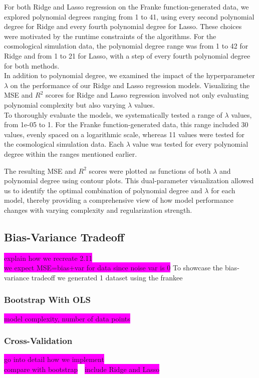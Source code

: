 \documentclass[aps,pra,english,notitlepage,reprint,nofootinbib]{revtex4-1}  %
\begin{document}
For both Ridge and Lasso regression on the Franke function-generated data, we explored polynomial degrees ranging from 1 to 41, using every second polynomial degree for Ridge and every fourth polynomial degree for Lasso. These choices were motivated by the runtime constraints of the algorithms. For the cosmological simulation data, the polynomial degree range was from 1 to 42 for Ridge and from 1 to 21 for Lasso, with a step of every fourth polynomial degree for both methods.\\

In addition to polynomial degree, we examined the impact of the hyperparameter $\lambda$ on the performance of our Ridge and Lasso regression models. Visualizing the MSE and $R^2$ scores for Ridge and Lasso regression involved not only evaluating polynomial complexity but also varying $\lambda$ values.\\

To thoroughly evaluate the models, we systematically tested a range of $\lambda$ values, from 1e-05 to 1. For the Franke function-generated data, this range included 30 values, evenly spaced on a logarithmic scale, whereas 11 values were tested for the cosmological simulation data. Each $\lambda$ value was tested for every polynomial degree within the ranges mentioned earlier.

The resulting MSE and $R^2$ scores were plotted as functions of both $\lambda$ and polynomial degree using contour plots. This dual-parameter visualization allowed us to identify the optimal combination of polynomial degree and $\lambda$ for each model, thereby providing a comprehensive view of how model performance changes with varying complexity and regularization strength.


\subsection{Bias-Variance Tradeoff}
\colorbox{magenta}{explain how we recreate 2.11} \\
\colorbox{magenta}{we expect MSE=bias+var for data since noise var is 0}
To showcase the bias-variance tradeoff we generated 1 dataset using the frankee
\subsubsection{Bootstrap With OLS}
\colorbox{magenta}{model complexity, number of data points}

\subsubsection{Cross-Validation}
\colorbox{magenta}{go into detail how we implement} \\
\colorbox{magenta}{compare with bootstrap}\ \
\colorbox{magenta}{include Ridge and Lasso}
\end{document}
